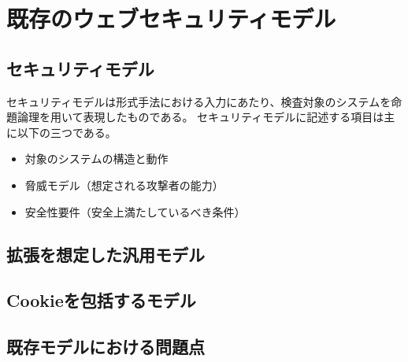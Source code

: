 \documentclass[12pt,a4paper]{jbook}
\begin{document}
\chapter{既存のウェブセキュリティモデル}
\section{セキュリティモデル}
\label{sec:SecurityModel}
セキュリティモデルは形式手法における入力にあたり、検査対象のシステムを命題論理を用いて表現したものである。
セキュリティモデルに記述する項目は主に以下の三つである。
\begin{itemize}
\item 対象のシステムの構造と動作
\item 脅威モデル（想定される攻撃者の能力）
\item 安全性要件（安全上満たしているべき条件）
\end{itemize}

\section{拡張を想定した汎用モデル}

\section{Cookieを包括するモデル}

\section{既存モデルにおける問題点}
\end{document}
